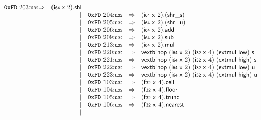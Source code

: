 $$\begin{array}{@{}l@{}rrlll@{}l@{}}
\mathtt{0xFD}~203{:}{\mathtt{u{\scriptstyle32}}} &\Rightarrow& (\mathsf{i{\scriptstyle64}}~\mathsf{x}~2) . \mathsf{shl} \\ &&|&
\mathtt{0xFD}~204{:}{\mathtt{u{\scriptstyle32}}} &\Rightarrow& (\mathsf{i{\scriptstyle64}}~\mathsf{x}~2) . ({\mathsf{shr\_}}{\mathsf{s}}) \\ &&|&
\mathtt{0xFD}~205{:}{\mathtt{u{\scriptstyle32}}} &\Rightarrow& (\mathsf{i{\scriptstyle64}}~\mathsf{x}~2) . ({\mathsf{shr\_}}{\mathsf{u}}) \\ &&|&
\mathtt{0xFD}~206{:}{\mathtt{u{\scriptstyle32}}} &\Rightarrow& (\mathsf{i{\scriptstyle64}}~\mathsf{x}~2) . \mathsf{add} \\ &&|&
\mathtt{0xFD}~209{:}{\mathtt{u{\scriptstyle32}}} &\Rightarrow& (\mathsf{i{\scriptstyle64}}~\mathsf{x}~2) . \mathsf{sub} \\ &&|&
\mathtt{0xFD}~213{:}{\mathtt{u{\scriptstyle32}}} &\Rightarrow& (\mathsf{i{\scriptstyle64}}~\mathsf{x}~2) . \mathsf{mul} \\ &&|&
\mathtt{0xFD}~220{:}{\mathtt{u{\scriptstyle32}}} &\Rightarrow& \mathsf{vextbinop}~(\mathsf{i{\scriptstyle64}}~\mathsf{x}~2)~(\mathsf{i{\scriptstyle32}}~\mathsf{x}~4)~(\mathsf{extmul}~\mathsf{low})~\mathsf{s} \\ &&|&
\mathtt{0xFD}~221{:}{\mathtt{u{\scriptstyle32}}} &\Rightarrow& \mathsf{vextbinop}~(\mathsf{i{\scriptstyle64}}~\mathsf{x}~2)~(\mathsf{i{\scriptstyle32}}~\mathsf{x}~4)~(\mathsf{extmul}~\mathsf{high})~\mathsf{s} \\ &&|&
\mathtt{0xFD}~222{:}{\mathtt{u{\scriptstyle32}}} &\Rightarrow& \mathsf{vextbinop}~(\mathsf{i{\scriptstyle64}}~\mathsf{x}~2)~(\mathsf{i{\scriptstyle32}}~\mathsf{x}~4)~(\mathsf{extmul}~\mathsf{low})~\mathsf{u} \\ &&|&
\mathtt{0xFD}~223{:}{\mathtt{u{\scriptstyle32}}} &\Rightarrow& \mathsf{vextbinop}~(\mathsf{i{\scriptstyle64}}~\mathsf{x}~2)~(\mathsf{i{\scriptstyle32}}~\mathsf{x}~4)~(\mathsf{extmul}~\mathsf{high})~\mathsf{u} \\ &&|&
\mathtt{0xFD}~103{:}{\mathtt{u{\scriptstyle32}}} &\Rightarrow& (\mathsf{f{\scriptstyle32}}~\mathsf{x}~4) . \mathsf{ceil} \\ &&|&
\mathtt{0xFD}~104{:}{\mathtt{u{\scriptstyle32}}} &\Rightarrow& (\mathsf{f{\scriptstyle32}}~\mathsf{x}~4) . \mathsf{floor} \\ &&|&
\mathtt{0xFD}~105{:}{\mathtt{u{\scriptstyle32}}} &\Rightarrow& (\mathsf{f{\scriptstyle32}}~\mathsf{x}~4) . \mathsf{trunc} \\ &&|&
\mathtt{0xFD}~106{:}{\mathtt{u{\scriptstyle32}}} &\Rightarrow& (\mathsf{f{\scriptstyle32}}~\mathsf{x}~4) . \mathsf{nearest} \\ &&|&

\end{array}$$
